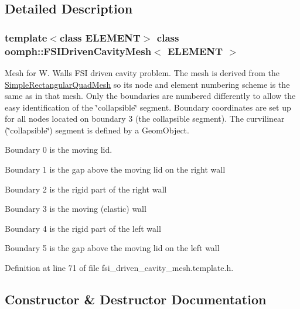 \subsection{Detailed Description}
\subsubsection*{template$<$class E\+L\+E\+M\+E\+NT$>$\newline
class oomph\+::\+F\+S\+I\+Driven\+Cavity\+Mesh$<$ E\+L\+E\+M\+E\+N\+T $>$}

Mesh for W. Wall\textquotesingle{}s F\+SI driven cavity problem. The mesh is derived from the {\ttfamily \hyperlink{classoomph_1_1SimpleRectangularQuadMesh}{Simple\+Rectangular\+Quad\+Mesh}} so it\textquotesingle{}s node and element numbering scheme is the same as in that mesh. Only the boundaries are numbered differently to allow the easy identification of the \char`\"{}collapsible\char`\"{} segment. Boundary coordinates are set up for all nodes located on boundary 3 (the collapsible segment). The curvilinear (\char`\"{}collapsible\char`\"{}) segment is defined by a {\ttfamily Geom\+Object}. 


\begin{DoxyItemize}
\item Boundary 0 is the moving lid.
\item Boundary 1 is the gap above the moving lid on the right wall
\item Boundary 2 is the rigid part of the right wall
\item Boundary 3 is the moving (elastic) wall
\item Boundary 4 is the rigid part of the left wall
\item Boundary 5 is the gap above the moving lid on the left wall 
\end{DoxyItemize}

Definition at line 71 of file fsi\+\_\+driven\+\_\+cavity\+\_\+mesh.\+template.\+h.



\subsection{Constructor \& Destructor Documentation}
\mbox{\label{classoomph_1_1FSIDrivenCavityMesh_af227477a1de5faf56352d21913a91feb}} 

